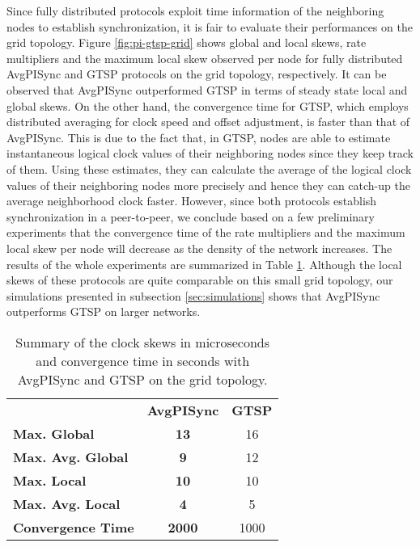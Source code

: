 \documentclass[english,a4paper,10pt,final]{article}
\numberwithin{equation}{section}
\numberwithin{figure}{section}
\begin{document}
Since fully distributed protocols exploit time information of the neighboring nodes to establish synchronization, it is fair to evaluate their performances on the grid topology. Figure \ref{fig:pi-gtsp-grid} shows global and local skews, rate multipliers and the maximum local skew observed per node for fully distributed AvgPISync and GTSP protocols on the grid topology, respectively. It can be observed that AvgPISync outperformed GTSP in terms of steady state local and global skews. On the other hand, the convergence time for GTSP, which employs distributed averaging for clock speed and offset adjustment, is faster than that of AvgPISync. This is due to the fact that, in GTSP, nodes are able to estimate instantaneous logical clock values of their neighboring nodes since they keep track of them. Using these estimates, they can calculate the average of the logical clock values of their neighboring nodes more precisely and hence they can catch-up the average neighborhood clock faster. However, since both protocols establish synchronization in a peer-to-peer, we conclude based on a few preliminary experiments that the convergence time of the rate multipliers and the maximum local skew per node will decrease as the density of the network increases. The results of the whole experiments are summarized in Table \ref{table:pi-gtsp}. Although the local skews of these protocols are quite comparable on this small grid topology, our simulations presented in subsection \ref{sec:simulations} shows that AvgPISync outperforms GTSP on larger networks.




\begin{table}

\center

\caption{ Summary of the clock skews in microseconds and convergence time in seconds with AvgPISync and GTSP on the grid topology. \label{table:pi-gtsp}}

\begin{tabular}{lcc}
 & \textbf{AvgPISync} & \textbf{GTSP} \\
\textbf{Max. Global}       	& {\bf 13}  & { 16} \\ 
\textbf{Max. Avg. Global }  & { \bf 9}  & { 12} \\ 
\textbf{Max. Local }        & { \bf 10}  & { 10} \\ 
\textbf{Max. Avg. Local }   & {\bf 4}   & { 5} \\ 
\textbf{Convergence Time }  & {\bf  2000 }  & {  1000}\\ 
\end{tabular}

\end{table}
\end{document}
